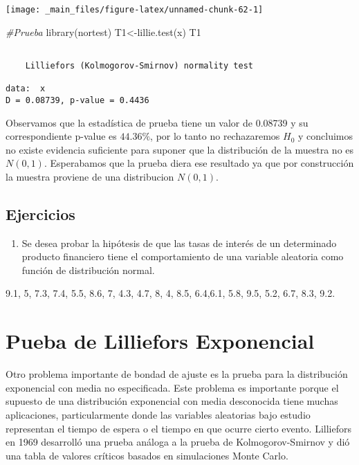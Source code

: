 \documentclass[
  a4paper,
  oneside,
  openany]{book}
\newenvironment{Shaded}{\begin{snugshade}}{\end{snugshade}}
\newcommand{\CommentTok}[1]{\textcolor[rgb]{0.56,0.35,0.01}{\textit{#1}}}
\newcommand{\FunctionTok}[1]{\textcolor[rgb]{0.00,0.00,0.00}{#1}}
\newcommand{\NormalTok}[1]{#1}
\newcommand{\OtherTok}[1]{\textcolor[rgb]{0.56,0.35,0.01}{#1}}
\providecommand{\tightlist}{%
  \setlength{\itemsep}{0pt}\setlength{\parskip}{0pt}}
\begin{document}
\begin{center}\texttt{[image: \_main\_files/figure-latex/unnamed-chunk-62-1]} \end{center}

\begin{Shaded}
\begin{Highlighting}[]
\CommentTok{\#Prueba}
\FunctionTok{library}\NormalTok{(nortest) }
\NormalTok{T1}\OtherTok{\textless{}{-}}\FunctionTok{lillie.test}\NormalTok{(x)}
\NormalTok{T1}
\end{Highlighting}
\end{Shaded}

\begin{verbatim}

    Lilliefors (Kolmogorov-Smirnov) normality test

data:  x
D = 0.08739, p-value = 0.4436
\end{verbatim}

Observamos que la estadística de prueba tiene un valor de 0.08739 y su correspondiente p-value es \(44.36\%\), por lo tanto no rechazaremos \(H_0\) y concluimos no existe evidencia suficiente para suponer que la distribución de la muestra no es \(N(0,1)\). Esperabamos que la prueba diera ese resultado ya que por construcción la muestra proviene de una distribucion \(N(0,1)\).

\hypertarget{ejercicios-12}{%
\section{Ejercicios}\label{ejercicios-12}}

\begin{enumerate}
\def\labelenumi{\arabic{enumi}.}
\tightlist
\item
  Se desea probar la hipótesis de que las tasas de interés de un determinado producto financiero tiene el comportamiento de una variable aleatoria como función de distribución normal.
\end{enumerate}

9.1, 5, 7.3, 7.4, 5.5, 8.6, 7, 4.3, 4.7, 8,
4, 8.5, 6.4,6.1, 5.8, 9.5, 5.2, 6.7, 8.3, 9.2.

\hypertarget{pueba-de-lilliefors-exponencial}{%
\chapter{Pueba de Lilliefors Exponencial}\label{pueba-de-lilliefors-exponencial}}

Otro problema importante de bondad de ajuste es la prueba para la distribución exponencial con media no especificada. Este problema es importante porque el supuesto de una distribución exponencial con media desconocida tiene muchas aplicaciones, particularmente donde las variables aleatorias bajo estudio representan el tiempo de espera o el tiempo en que ocurre cierto evento.
Lilliefors en 1969 desarrolló una prueba análoga a la prueba de Kolmogorov-Smirnov y dió una tabla de valores críticos basados en simulaciones Monte Carlo.
\end{document}
